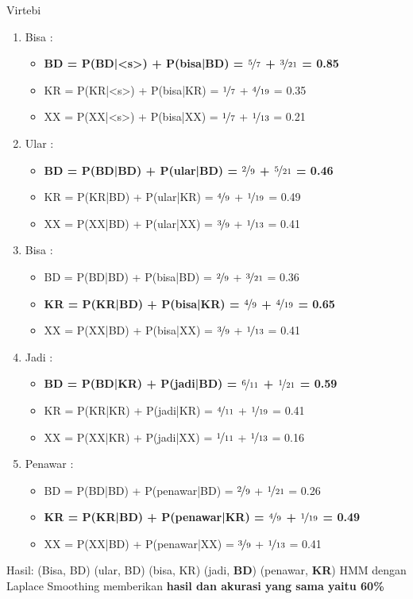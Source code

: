 \documentclass[paper=a4, fontsize=11pt]{scrartcl} %
\numberwithin{equation}{section} %
\numberwithin{figure}{section} %
\numberwithin{table}{section} %
\begin{document}
Virtebi
\begin{enumerate}
	\item Bisa :
	\begin{itemize}
		\item \textbf{BD = P(BD|<s>) + P(bisa|BD) = $\nicefrac{5}{7}$ + $\nicefrac{3}{21}$ = 0.85}				
		\item KR = P(KR|<s>) + P(bisa|KR) = $\nicefrac{1}{7}$ + $\nicefrac{4}{19}$ = 0.35
		\item XX = P(XX|<s>) + P(bisa|XX) = $\nicefrac{1}{7}$ + $\nicefrac{1}{13}$ = 0.21				
	\end{itemize}
	\item Ular :
	\begin{itemize}
		\item \textbf{BD = P(BD|BD) + P(ular|BD) = $\nicefrac{2}{9}$ + $\nicefrac{5}{21}$ = 0.46}				
		\item KR = P(KR|BD) + P(ular|KR) = $\nicefrac{4}{9}$ + $\nicefrac{1}{19}$ = 0.49
		\item XX = P(XX|BD) + P(ular|XX) = $\nicefrac{3}{9}$ + $\nicefrac{1}{13}$ = 0.41			
	\end{itemize}
	\item Bisa :
	\begin{itemize}
		\item BD = P(BD|BD) + P(bisa|BD) = $\nicefrac{2}{9}$ + $\nicefrac{3}{21}$ = 0.36
		\item \textbf{KR = P(KR|BD) + P(bisa|KR) = $\nicefrac{4}{9}$ + $\nicefrac{4}{19}$ = 0.65}
		\item XX = P(XX|BD) + P(bisa|XX) = $\nicefrac{3}{9}$ + $\nicefrac{1}{13}$ = 0.41				
	\end{itemize}
	\item Jadi : 
	\begin{itemize}
		\item \textbf{BD = P(BD|KR) + P(jadi|BD) = $\nicefrac{6}{11}$ + $\nicefrac{1}{21}$ = 0.59}
		\item KR = P(KR|KR) + P(jadi|KR) = $\nicefrac{4}{11}$ + $\nicefrac{1}{19}$ = 0.41
		\item XX = P(XX|KR) + P(jadi|XX) = $\nicefrac{1}{11}$ + $\nicefrac{1}{13}$ = 0.16
	\end{itemize}
	\item Penawar : 
	\begin{itemize}
		\item BD = P(BD|BD) + P(penawar|BD) = $\nicefrac{2}{9}$ + $\nicefrac{1}{21}$ = 0.26
		\item \textbf{KR = P(KR|BD) + P(penawar|KR) = $\nicefrac{4}{9}$ + $\nicefrac{1}{19}$ = 0.49}
		\item XX = P(XX|BD) + P(penawar|XX) = $\nicefrac{3}{9}$ + $\nicefrac{1}{13}$ = 0.41
	\end{itemize}		
\end{enumerate}
Hasil: (Bisa, BD) (ular, BD) (bisa, KR) (jadi, \textbf{BD}) (penawar, \textbf{KR})
HMM dengan Laplace Smoothing memberikan \textbf{hasil dan akurasi yang sama yaitu 60\%}
\end{document}
